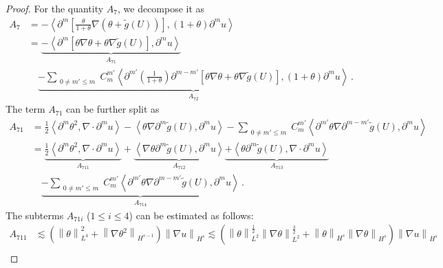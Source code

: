 \documentclass[reqno,11pt]{amsart}
\numberwithin{equation}{section}
\begin{document}
\begin{proof}
For the quantity $A_7$, we decompose it as
\begin{equation*}
\begin{aligned}
A_{7}&= -\left\langle \partial^m \left[ \frac{\theta}{1+\theta} \nabla \left( \theta + \tilde{g}(U) \right) \right], (1+\theta)\partial^m u \right\rangle \\
&=\underset{A_{71}}{\underbrace{- \left\langle \partial^m \left[ \theta \nabla \theta + \theta \nabla \tilde{g}(U) \right], \partial^m u \right\rangle}} \\
&\quad \underset{A_{72}}{\underbrace{- \sum_{\substack{0 \neq m' \leq m}} C_m^{m'} \left\langle \partial^{m'} \left( \frac{1}{1+\theta} \right) \partial^{m - m'} \left[ \theta \nabla \theta + \theta \nabla \tilde{g}(U) \right],(1+\theta) \partial^m u \right\rangle}}  \,.
\end{aligned}
\end{equation*}
The term $A_{71}$ can be further split as
\begin{equation*}
\begin{aligned}
A_{71}&=  \frac{1}{2} \left\langle \partial^m \theta^2, \nabla \cdot \partial^m u \right\rangle - \left\langle  \theta \nabla \partial^m\tilde{g}(U), \partial^m u \right\rangle - \sum_{\substack{0 \neq m' \leq m}} C_m^{m'} \left\langle \partial^{m'} \theta \nabla \partial^{m - m'} \tilde{g}(U), \partial^m u \right\rangle \\
&=\underset{A_{711}}{\underbrace{ \frac{1}{2} \left\langle \partial^m \theta^2, \nabla \cdot \partial^m u \right\rangle}} + \underset{A_{712}}{\underbrace{\left\langle \nabla \theta \partial^m \tilde{g}(U), \partial^m u \right\rangle}} \underset{A_{713}}{\underbrace{  + \left\langle \theta \partial^m \tilde{g}(U), \nabla \cdot \partial^m u \right\rangle}} \\
&\quad \underset{A_{714}}{\underbrace{ - \sum_{\substack{0 \neq m' \leq m}} C_m^{m'} \left\langle \partial^{m'} \theta \nabla \partial^{m - m'} \tilde{g}(U), \partial^m u \right\rangle}}
 \,.
\end{aligned}
\end{equation*}
The subterms $A_{71i}$ ($1 \leq i \leq 4$) can be estimated as follows:
\begin{equation*}
\begin{aligned}
A_{711}&\lesssim \left( \left\| \theta \right\|_{L^4}^2 + \left\| \nabla \theta^2  \right\|_{H^{s-1}}\right) \left\|\nabla u \right\|_{H^s} \lesssim \left( \left\| \theta \right\|^{\frac{1}{2}}_{L^2} \left\| \nabla \theta \right\|^{\frac{3}{2}}_{L^2} + \left\| \theta \right\|_{H^s} \left\| \nabla \theta \right\|_{H^s} \right) \left\|\nabla u \right\|_{H^s} \\

\end{aligned}
\end{equation*}
\end{proof}
\end{document}
